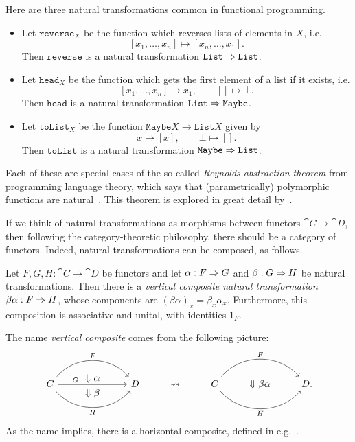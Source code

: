 \begin{ex}
  Here are three natural transformations common in functional programming.
  \begin{itemize}
    \item Let $\texttt{reverse}_X$ be the function which reverses lists of
      elements in $X$, i.e. \[
        [x_1, \ldots, x_n]\mapsto [x_n, \ldots, x_1].
      \] Then $\texttt{reverse}$ is a natural transformation $\texttt{List}\Rightarrow
      \texttt{List}$.
    \item Let $\texttt{head}_X$ be the function which gets the first element of
      a list if it exists, i.e. \[
        [x_1, \ldots, x_n]\mapsto x_1,\quad\quad []\mapsto\bot.
      \] Then $\texttt{head}$ is a natural transformation
      $\texttt{List}\Rightarrow\texttt{Maybe}$.
    \item Let $\texttt{toList}_X$ be the function $\texttt{Maybe}
      X\to\texttt{List} X$ given by \[
        x\mapsto [x], \quad\quad \bot\mapsto[].
      \] Then $\texttt{toList}$ is a natural transformation
      $\texttt{Maybe}\Rightarrow\texttt{List}$.
  \end{itemize}
  Each of these are special cases of the so-called \emph{Reynolds
  abstraction theorem} from programming language theory, which says that
  (parametrically) polymorphic functions are natural~\cite{reynolds-1983}.
  This theorem is explored in great detail by~\cite{wadler-1989}.
\end{ex}

If we think of natural transformations as morphisms between functors
$\cat{C}\to\cat{D}$, then following the category-theoretic philosophy, there
should be a category of functors. Indeed, natural transformations can be
composed, as follows.

\begin{prop}
  Let $F,G,H: \cat{C}\to\cat{D}$ be functors and let $\alpha: F\Rightarrow G$ and
  $\beta: G\Rightarrow H$ be natural transformations. Then there is a \emph{vertical
  composite  natural transformation} $\beta\alpha: F\Rightarrow H$, whose components are
  $(\beta\alpha)_x = \beta_x\alpha_x$. Furthermore, this composition is
  associative and unital, with identities $1_F$.
\end{prop}

The name \emph{vertical composite} comes from the following picture: \[
  \begin{tikzcd}[baseline=(current bounding box.center)]
    & \Downarrow\alpha \\[-28pt]
    C\ar[rr, "F", bend left=50]\ar[rr, "G", near start]\ar[rr, "H"', bend right=50] && D & \rightsquigarrow & C \ar[rr, "F", bend left=50]\ar[rr, "H"', bend right=50] & \Downarrow\beta\alpha & D\punctuation{.} \\[-25pt]
    & \Downarrow\beta
  \end{tikzcd}
\]
As the name implies, there is a horizontal composite, defined in
e.g.~\cite[Lemma 1.7.4]{riehl-2017}.

